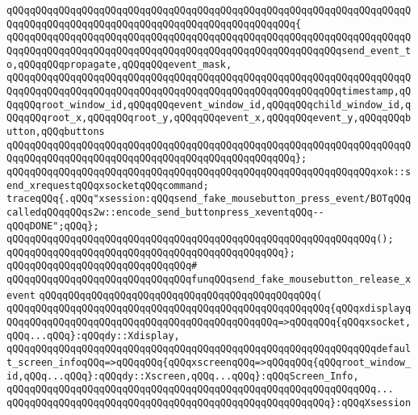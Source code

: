 \verb|qQQqqQQqqQQqqQQqqQQqqQQqqQQqqQQqqQQqqQQqqQQqqQQqqQQqqQQqqQQqqQQqqQQqqQQqqQQqqQQqqQQqqQQqqQQqqQQqqQQqqQQqqQQqqQQqqQQqqQQq{|\newline
\verb|qQQqqQQqqQQqqQQqqQQqqQQqqQQqqQQqqQQqqQQqqQQqqQQqqQQqqQQqqQQqqQQqqQQqqQQqqQQqqQQqqQQqqQQqqQQqqQQqqQQqqQQqqQQqqQQqqQQqqQQqqQQqqQQqsend_event_to,qQQqqQQqpropagate,qQQqqQQqevent_mask,|\newline
\verb|qQQqqQQqqQQqqQQqqQQqqQQqqQQqqQQqqQQqqQQqqQQqqQQqqQQqqQQqqQQqqQQqqQQqqQQqqQQqqQQqqQQqqQQqqQQqqQQqqQQqqQQqqQQqqQQqqQQqqQQqqQQqqQQqtimestamp,qQQqqQQqroot_window_id,qQQqqQQqevent_window_id,qQQqqQQqchild_window_id,qQQqqQQqroot_x,qQQqqQQqroot_y,qQQqqQQqevent_x,qQQqqQQqevent_y,qQQqqQQqbutton,qQQqbuttons|\newline
\verb|qQQqqQQqqQQqqQQqqQQqqQQqqQQqqQQqqQQqqQQqqQQqqQQqqQQqqQQqqQQqqQQqqQQqqQQqqQQqqQQqqQQqqQQqqQQqqQQqqQQqqQQqqQQqqQQqqQQqqQQq};|\newline
\newline
\verb|qQQqqQQqqQQqqQQqqQQqqQQqqQQqqQQqqQQqqQQqqQQqqQQqqQQqqQQqqQQqqQQqxok::send_xrequestqQQqxsocketqQQqcommand;|\newline
\newline
\verb|traceqQQq{.qQQq"xsession:qQQqsend_fake_mousebutton_press_event/BOTqQQqcalledqQQqqQQqs2w::encode_send_buttonpress_xeventqQQq--qQQqDONE";qQQq};|\newline
\verb|qQQqqQQqqQQqqQQqqQQqqQQqqQQqqQQqqQQqqQQqqQQqqQQqqQQqqQQqqQQqqQQq();|\newline
\verb|qQQqqQQqqQQqqQQqqQQqqQQqqQQqqQQqqQQqqQQqqQQqqQQq};|\newline
\verb|qQQqqQQqqQQqqQQqqQQqqQQqqQQqqQQq#|\newline
\verb|qQQqqQQqqQQqqQQqqQQqqQQqqQQqqQQqfunqQQqsend_fake_mousebutton_release_xevent|\newline
\verb|qQQqqQQqqQQqqQQqqQQqqQQqqQQqqQQqqQQqqQQqqQQqqQQq(|\newline
\verb|qQQqqQQqqQQqqQQqqQQqqQQqqQQqqQQqqQQqqQQqqQQqqQQqqQQqqQQq{qQQqxdisplayqQQqqQQqqQQqqQQqqQQqqQQqqQQqqQQqqQQqqQQqqQQqqQQq=>qQQqqQQq{qQQqxsocket,qQQq...qQQq}:qQQqdy::Xdisplay,|\newline
\verb|qQQqqQQqqQQqqQQqqQQqqQQqqQQqqQQqqQQqqQQqqQQqqQQqqQQqqQQqqQQqqQQqdefault_screen_infoqQQq=>qQQqqQQq{qQQqxscreenqQQq=>qQQqqQQq{qQQqroot_window_id,qQQq...qQQq}:qQQqdy::Xscreen,qQQq...qQQq}:qQQqScreen_Info,|\newline
\verb|qQQqqQQqqQQqqQQqqQQqqQQqqQQqqQQqqQQqqQQqqQQqqQQqqQQqqQQqqQQqqQQq...|\newline
\verb|qQQqqQQqqQQqqQQqqQQqqQQqqQQqqQQqqQQqqQQqqQQqqQQqqQQqqQQq}:qQQqXsession|\newline
